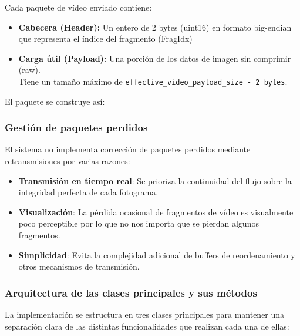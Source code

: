 Cada paquete de vídeo enviado contiene:

\begin{itemize}
    \item \textbf{Cabecera (Header):} Un entero de 2 bytes (uint16) en formato big-endian que representa el índice del fragmento (FragIdx)
    \item \textbf{Carga útil (Payload):} Una porción de los datos de imagen sin comprimir (raw). \\
    Tiene un tamaño máximo de \texttt{effective\_video\_payload\_size - 2 bytes}.
\end{itemize}

\noindent
El paquete se construye así:
\begin{center}
\end{center}

\subsubsection{Gestión de paquetes perdidos}

El sistema no implementa corrección de paquetes perdidos mediante retransmisiones por varias razones:

\begin{itemize}
    \item \textbf{Transmisión en tiempo real}: Se prioriza la continuidad del flujo sobre la integridad perfecta de cada fotograma.
    \item \textbf{Visualización}: La pérdida ocasional de fragmentos de vídeo es visualmente poco perceptible por lo que no nos importa que se pierdan algunos fragmentos.
    \item \textbf{Simplicidad}: Evita la complejidad adicional de buffers de reordenamiento y otros mecanismos de transmisión.
\end{itemize}

\subsubsection{Arquitectura de las clases principales y sus métodos}

La implementación se estructura en tres clases principales para mantener una separación clara de las distintas funcionalidades que realizan cada una de ellas:

